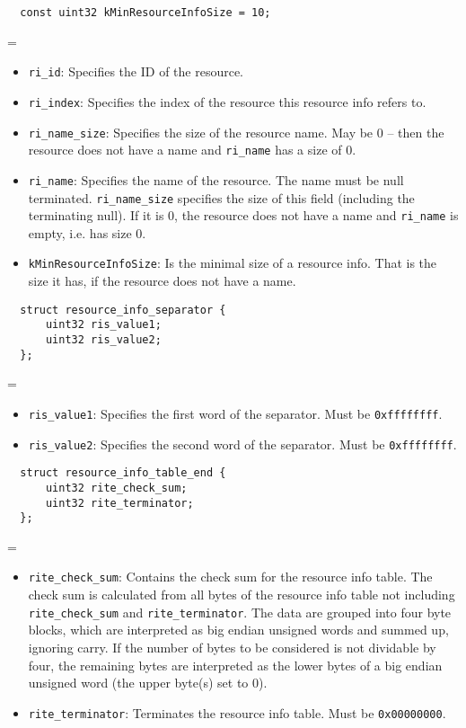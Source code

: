 \documentclass[12pt, a4paper]{article}
\newcommand{\code}[1]{{\tt #1}}
\newenvironment{nitemize}{
  \newdimen\oldparindent
  \oldparindent=\parindent
  \begin{itemize}
  \itemindent=-\oldparindent
}{
  \end{itemize}
}
\newcommand{\codeblockbegin}{\begin{flushleft}\begin{minipage}{\textwidth}}
\newcommand{\codeblockend}{\end{minipage}\end{flushleft}}
\begin{document}
\begin{verbatim}
  const uint32 kMinResourceInfoSize = 10;
\end{verbatim}
%
\begin{nitemize}
\item{\code{ri\_id}:
  Specifies the ID of the resource.
}
\item{\code{ri\_index}:
  Specifies the index of the resource this resource info refers to.
}
\item{\code{ri\_name\_size}:
  Specifies the size of the resource name. May be 0 -- then the resource does
  not have a name and \code{ri\_name} has a size of 0.
}
\item{\code{ri\_name}:
  Specifies the name of the resource. The name must be null terminated.
  \code{ri\_name\_size} specifies the size of this field (including the
  terminating null). If it is 0, the resource does not have a name and
  \code{ri\_name} is empty, i.e. has size 0.
}
\item{\code{kMinResourceInfoSize}:
  Is the minimal size of a resource info. That is the size it has, if the
  resource does not have a name.
}
\end{nitemize}
%
\codeblockbegin
\begin{verbatim}
  struct resource_info_separator {
      uint32 ris_value1;
      uint32 ris_value2;
  };
\end{verbatim}
\codeblockend
%
\begin{nitemize}
\item{\code{ris\_value1}:
  Specifies the first word of the separator.
  Must be \code{0xffffffff}.
}
\item{\code{ris\_value2}:
  Specifies the second word of the separator.
  Must be \code{0xffffffff}.
}
\end{nitemize}
%
\codeblockbegin
\begin{verbatim}
  struct resource_info_table_end {
      uint32 rite_check_sum;
      uint32 rite_terminator;
  };
\end{verbatim}
\codeblockend
%
\begin{nitemize}
\item{\code{rite\_check\_sum}:
  Contains the check sum for the resource info table. The check sum is
  calculated from all bytes of the resource info table not including
  \code{rite\_check\_sum} and \code{rite\_terminator}. The data are grouped
  into four byte blocks, which are interpreted as big endian unsigned words
  and summed up, ignoring carry. If the number of bytes to be considered is
  not dividable by four, the remaining bytes are interpreted as the lower
  bytes of a big endian unsigned word (the upper byte(s) set to 0).
}
\item{\code{rite\_terminator}:
  Terminates the resource info table.
  Must be \code{0x00000000}.
}
\end{nitemize}
\end{document}
